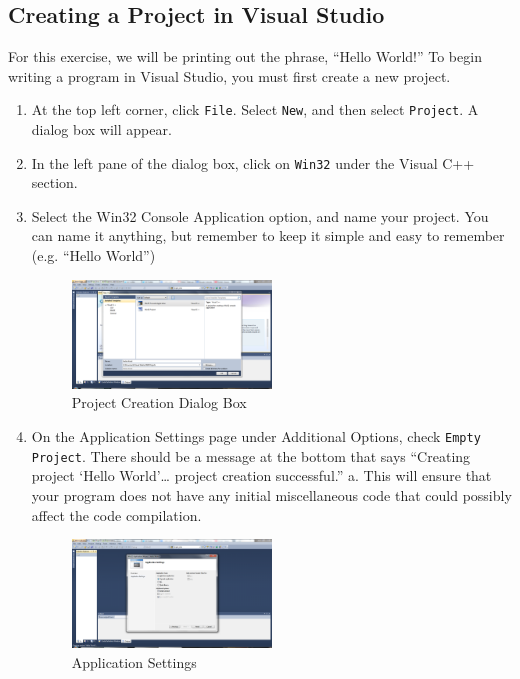\documentclass[twocolumn]{article}
\begin{document}
\subsection{Creating a Project in Visual Studio}	For this exercise, we will be printing out the phrase, “Hello World!” To begin writing a program in Visual Studio, you must first create a new project.
\begin{enumerate}
	\item At the top left corner, click \texttt{File}. Select \texttt{New}, and then select \texttt{Project}. A dialog box will appear.
	\item In the left pane of the dialog box, click on \texttt{Win32} under the Visual C++ section.
	\item Select the Win32 Console Application option, and name your project. You can name it anything, but remember to keep it simple and easy to remember (e.g. “Hello World”)
		\begin{figure}[htbp]
		\centering
		\includegraphics[width=0.5\textwidth]{1.png}
		\caption{Project Creation Dialog Box}
		\label{fig:projcreation}
	\end{figure}
	\item On the Application Settings page under Additional Options, check \texttt{Empty Project}. There should be a message at the bottom that says “Creating project ‘Hello World’… project creation successful.” a.	This will ensure that your program does not have any initial miscellaneous code that could possibly affect the code compilation.
		\begin{figure}[htbp]
		\centering
		\includegraphics[width=0.5\textwidth]{2.png}
		\caption{Application Settings}
		\label{fig:appsettings}
	\end{figure}
\end{enumerate}
\end{document}

